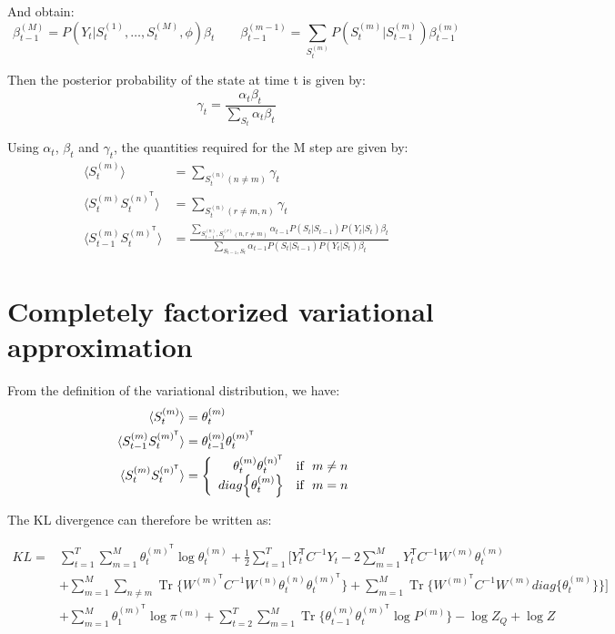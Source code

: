\documentclass{article}
\DeclareMathOperator{\Tr}{Tr}
\begin{document}
And obtain:
\[ \beta_{t-1}^{(M)} = P(Y_t | S_t^{(1)},\dots,S_t^{(M)}, \phi) \beta_t \qquad \beta_{t-1}^{(m-1)} = \sum_{S_{t}^{(m)}} P(S_t^{(m)} | S_{t-1}^{(m)}) \beta_{t-1}^{(m)} \]

Then the posterior probability of the state at time t is given by:
\[ \gamma_t = \frac{\alpha_t \beta_t}{\sum_{S_t} \alpha_t \beta_t} \]

Using $\alpha_t$, $\beta_t$ and $\gamma_t$, the quantities required for the M step are given by:
\begin{align*}
\langle S_t^{(m)} \rangle &= \sum_{S_t^{(n)} (n \ne m)} \gamma_t \\
\langle S_t^{(m)} S_t^{(n)^\mathsf{T}} \rangle &= \sum_{S_t^{(n)} (r \ne m,n)} \gamma_t \\
\langle S_{t-1}^{(m)} S_t^{(m)^\mathsf{T}} \rangle &= \frac{\sum_{S_{t-1}^{(n)},S_t^{(r)} (n,r \ne m)} \alpha_{t-1} P(S_t | S_{t-1}) P(Y_t | S_t) \beta_t}{\sum_{S_{t-1},S_t} \alpha_{t-1} P(S_t | S_{t-1}) P(Y_t | S_t) \beta_t}
\end{align*}

\section{Completely factorized variational approximation}

From the definition of the variational distribution, we have:
\begin{align*}
\langle S_t^{(m)} \rangle &= \theta_t^{(m)} \\
\langle S_{t-1}^{(m)} S_t^{(m)^\mathsf{T}} \rangle &= \theta_{t-1}^{(m)} \theta_t^{(m)^\mathsf{T}} \\
\langle S_t^{(m)} S_t^{(n)^\mathsf{T}} \rangle &= \left\{
  \begin{array}{rcr}
    \theta_{t}^{(m)} \theta_t^{(n)^\mathsf{T}} \quad \textnormal{if} \ \ m \ne n \\
    diag\Big\{\theta_t^{(m)}\Big\} \quad \textnormal{if} \ \ m = n \\
  \end{array}
\right.
\end{align*}

The KL divergence can therefore be written as:

\begin{align*}
KL = &\sum_{t=1}^T \sum_{m=1}^M \theta_t^{(m)^\mathsf{T}} \log \theta_t^{(m)} + \frac{1}{2} \sum_{t=1}^T \Bigg[ Y_t^\mathsf{T} C^{-1} Y_t - 2 \sum_{m=1}^M Y_t^\mathsf{T} C^{-1} W^{(m)} \theta_t^{(m)} \\
&+ \sum_{m=1}^M \sum_{n \ne m} \Tr\bigg\{ W^{(m)^\mathsf{T}} C^{-1} W^{(n)} \theta_t^{(n)} \theta_t^{(m)^\mathsf{T}} \bigg\} + \sum_{m=1}^M \Tr\bigg\{ W^{(m)^\mathsf{T}} C^{-1} W^{(m)} diag\Big\{\theta_t^{(m)}\Big\} \bigg\} \Bigg] \\
&+ \sum_{m=1}^M \theta_1^{(m)^\mathsf{T}} \log \pi^{(m)} + \sum_{t=2}^T \sum_{m=1}^M \Tr\bigg\{ \theta_{t-1}^{(m)} \theta_t^{(m)^\mathsf{T}} \log P^{(m)} \bigg\} - \log Z_Q + \log Z
\end{align*}
\end{document}

